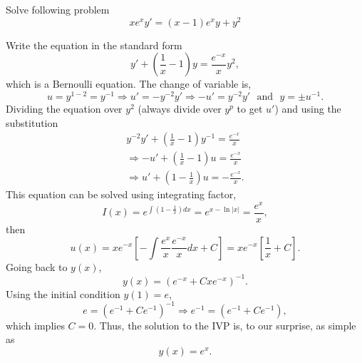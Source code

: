\documentclass[11pt]{article}
\begin{document}
\begin{problem}
Solve following problem
\begin{equation*}
      xe^{x}y'= (x-1)e^{x}y+y^{2}
\end{equation*}
\end{problem}
\begin{solution}
Write the equation in the standard form
\[y'+\left( \frac{1}{x} - 1 \right)y=\frac{e^{-x}}{x}y^{2},\]
which is a Bernoulli equation. The change of variable is,
\[u = y^{1-2}=y^{-1}\Rightarrow u'=- y^{-2}y' \Rightarrow -u'= y^{-2}y' \,\,\text{ and }\,\, y = \pm u^{-1}.\]
Dividing the equation over $y^{2}$ (always divide over $y^{p}$ to get $u'$) and using the substitution
\begin{gather*}
y^{-2}y'+\left( \frac{1}{x} - 1 \right)y^{-1}=\frac{e^{-x}}{x} \\
\Rightarrow -u' + \left( \frac{1}{x} - 1 \right)u=\frac{e^{-x}}{x} \\
\Rightarrow u' + \left( 1 - \frac{1}{x} \right) u= -\frac{e^{-x}}{x}.
\end{gather*}
This equation can be solved using integrating factor,
\[I(x)=e^{\int\left( 1 - \frac{1}{x} \right) dx}=e^{x - \ln |x|}=\frac{e^{x}}{x},\]
then
\[u(x)= xe^{-x}\left[-\int \frac{e^{x}}{x} \frac{e^{-x}}{x} dx + C\right]= xe^{-x}\left[\frac{1}{x} + C \right].\]
Going back to $y(x)$,
\[y(x)= \left( e^{-x}  + Cxe^{-x} \right)^{-1}.\]
Using the initial condition $y(1)=e$,
\[e=\left( e^{-1}  + Ce^{-1} \right)^{-1}\Rightarrow e^{-1}=\left( e^{-1}  + Ce^{-1} \right),\]
which implies $C=0$. Thus, the solution to the IVP is, to our surprise, as simple as
\[\boxed{y(x)= e^{x}}.\]
\end{solution}
\end{document}
